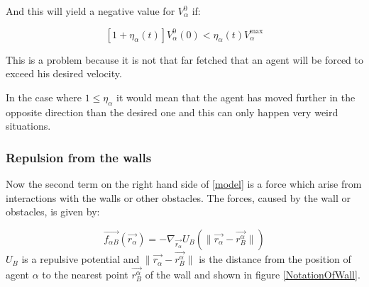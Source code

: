 \begin{itemize}
And this will yield a negative value for $V_{\alpha}^{0}$ if: 

\begin{equation}
\left[ 1 + \eta_{\alpha} \left( t \right) \right] 
V_{\alpha}^{0} \left( 0 \right) < \eta_{\alpha} \left( t \right)V_{\alpha}^{\text{max}} 
\end{equation}

This is a problem because it is not that far fetched that an agent will be 
forced to exceed his desired velocity.

In the case where $1 \leq \eta_{\alpha}$ it would mean that the agent has moved 
further in the opposite direction than the desired one and this can only happen very 
weird situations.
\end{itemize}


\subsubsection{Repulsion from the walls}
Now the second term on the right hand side of \eqref{model} is a force which arise from interactions with the walls or other obstacles. The forces, caused by the wall or obstacles, is given by:

\begin{equation}\label{wallpotential}
    \vec{f_{\alpha B}} \left( \vec{r_{\alpha}} \right) =
    - \nabla_{\vec{r_{\alpha}}} U_{B}
    \left( \| \vec{r_{\alpha}} - \vec{r_{B}^{\alpha}} \| \right)
\end{equation}
$U_B$ is a repulsive potential and $ \| \vec{r_{\alpha}} - \vec{r_{B}^{\alpha}} \|$ is the distance 
from the position of agent $\alpha$ to the nearest point $ \vec{r_{B}^{\alpha}}  $ of the wall and shown in figure \ref{NotationOfWall}.

